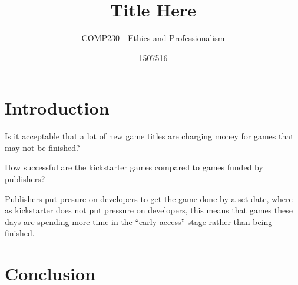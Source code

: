 \documentclass{scrartcl}
\title{Title Here}
\subtitle{COMP230 - Ethics and Professionalism}
\author{1507516}
\begin{document}
\maketitle

\abstract{}

\section{Introduction}


Is it acceptable that a lot of new game titles are charging money for games that may not be finished?

How successful are the kickstarter games compared to games funded by publishers?

Publishers put presure on developers to get the game done by a set date, where as kickstarter does not put pressure on developers, this means that games these days are spending more time in the ``early access'' stage rather than being finished.


\section{}


\section{Conclusion}




\end{document}
